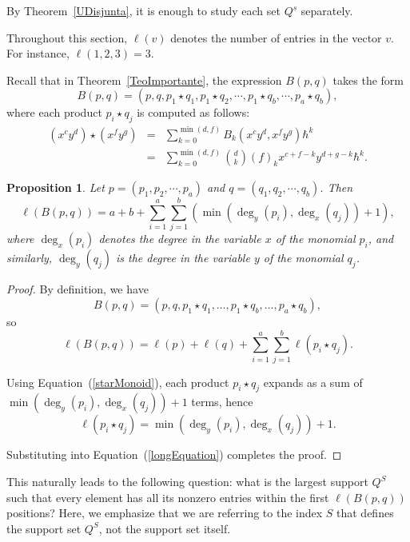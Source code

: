 \documentclass[11pt]{article}
\newtheorem{prop}[thm]{Proposition} %
\begin{document}
By Theorem~\ref{UDisjunta}, it is enough to study each set \( Q^{s} \) separately.

Throughout this section, \( \ell(v) \) denotes the number of entries in the vector \( v \). For instance, \( \ell(1,2,3) = 3 \).

Recall that in Theorem~\ref{TeoImportante}, the expression \( B(p,q) \) takes the form
$$B(p,q)=(p,q,p_1\star q_1,p_1\star q_2,\cdots,p_1\star q_b,\cdots,p_a\star q_b),$$
where each product \( p_i \star q_j \) is computed as follows:
\begin{equation}\label{starMonoid}
\begin{array}{ccc}
     (x^{c}y^{d})\star(x^{f}y^{g}) & = & \displaystyle\sum_{k=0}^{\min(d,f)} B_{k}(x^cy^d,x^fy^g)\hbar^k \\
      & = & \displaystyle\sum_{k=0}^{\min(d,f)}\binom{d}{k}(f)_{k}x^{c+f-k}y^{d+g-k}\hbar^k.
\end{array}
\end{equation}

\begin{prop}\label{ellBpq}
Let $p=(p_1,p_2,\cdots,p_{a})$ and $q=(q_1,q_2,\cdots,q_{b})$. Then
$$\ell(B(p, q))= a + b + \sum_{i=1}^{a} \sum_{j=1}^{b} \left( \min (\deg_y(p_i), \deg_x(q_j)) + 1 \right),$$
where $\deg_x(p_i)$ denotes the degree in the variable $x$ of the monomial $p_i$, and similarly, $\deg_y(q_j)$ is the degree in the variable $y$ of the monomial $q_j$.
\end{prop}

\begin{proof}
By definition, we have
\[
B(p,q) = (p, q, p_1 \star q_1, \ldots, p_1 \star q_b, \ldots, p_a \star q_b),
\]
so
\begin{equation}\label{longEquation}
\ell(B(p,q)) = \ell(p) + \ell(q) + \sum_{i=1}^{a} \sum_{j=1}^{b} \ell(p_i \star q_j).
\end{equation}

Using Equation~(\ref{starMonoid}), each product \( p_i \star q_j \) expands as a sum of \( \min(\deg_y(p_i), \deg_x(q_j)) + 1 \) terms, hence
\[
\ell(p_i \star q_j) = \min(\deg_y(p_i), \deg_x(q_j)) + 1.
\]

Substituting into Equation~(\ref{longEquation}) completes the proof.
\end{proof}


This naturally leads to the following question: what is the largest support $Q^{S}$ such that every element has all its nonzero entries within the first $\ell(B(p,q))$ positions? Here, we emphasize that we are referring to the index $S$ that defines the support set $Q^S$, not the support set itself.
\end{document}
